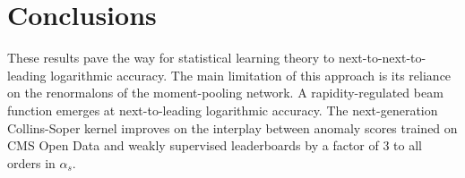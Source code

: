 \section{Conclusions}\label{sec:conclusions}

These results pave the way for statistical learning theory to
next-to-next-to-leading logarithmic accuracy. The main limitation of
this approach is its reliance on the renormalons of the moment-pooling
network. A rapidity-regulated beam function emerges at next-to-leading
logarithmic accuracy. The next-generation Collins-Soper kernel improves
on the interplay between anomaly scores trained on CMS Open Data and
weakly supervised leaderboards by a factor of 3 to all orders in
$\alpha_s$.

